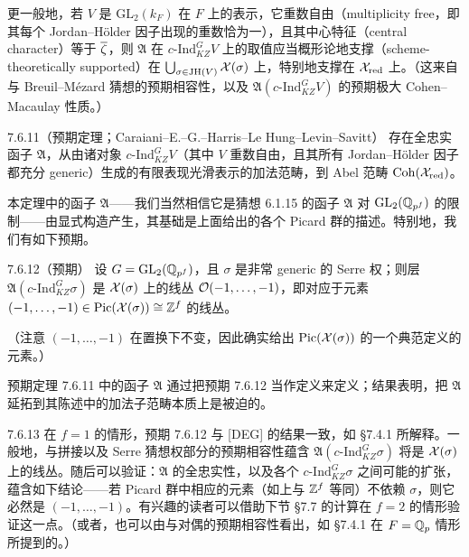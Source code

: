 更一般地，若 $V$ 是 $\mathrm{GL}_2(k_F)$ 在 $F$ 上的表示，它重数自由（multiplicity free，即其每个 Jordan--Hölder 因子出现的重数恰为一），且其中心特征（central character）等于 $\overline\zeta$，则 $\mathfrak A$ 在 $c\text{-}\mathrm{Ind}^G_{KZ}V$ 上的取值应当概形论地支撑（scheme-theoretically supported）在 $\bigcup_{\sigma\in\mathrm{JH}(V)}\mathcal{X}(\sigma)$ 上，特别地支撑在 $\mathcal{X}_{\mathrm{red}}$ 上。（这来自与 Breuil--Mézard 猜想的预期相容性，以及 $\mathfrak A(c\text{-}\mathrm{Ind}^G_{KZ}V)$ 的预期极大 Cohen--Macaulay 性质。）

\begin{thm}{7.6.11（预期定理；Caraiani--E.--G.--Harris--Le Hung--Levin--Savitt）}\label{thm:a4-7-6-11}
存在全忠实函子 $\mathfrak A$，从由诸对象 $c\text{-}\mathrm{Ind}^G_{KZ}V$（其中 $V$ 重数自由，且其所有 Jordan--Hölder 因子都充分 generic）生成的有限表现光滑表示的加法范畴，到 Abel 范畴 $\operatorname{Coh}(\mathcal{X}_{\mathrm{red}})$。
\end{thm}

本定理中的函子 $\mathfrak A$——我们当然相信它是猜想 6.1.15 的函子 $\mathfrak A$ 对 $\mathrm{GL}_2(\mathbb{Q}_{p^f})$ 的限制——由显式构造产生，其基础是上面给出的各个 Picard 群的描述。特别地，我们有如下预期。

\begin{thm}{7.6.12（预期）}\label{thm:a4-7-6-12}
设 $G=\mathrm{GL}_2(\mathbb{Q}_{p^f})$，且 $\sigma$ 是非常 generic 的 Serre 权；则层 $\mathfrak A(c\text{-}\mathrm{Ind}^G_{KZ}\sigma)$ 是 $\mathcal{X}(\sigma)$ 上的线丛 $\mathcal{O}(-1,\dots,-1)$，即对应于元素 $(-1,\dots,-1)\in\mathrm{Pic}(\mathcal{X}(\sigma))\cong\mathbb{Z}^f$ 的线丛。
\end{thm}

（注意 $(-1,\dots,-1)$ 在置换下不变，因此确实给出 $\mathrm{Pic}(\mathcal{X}(\sigma))$ 的一个典范定义的元素。）

预期定理 7.6.11 中的函子 $\mathfrak A$ 通过把预期 7.6.12 当作定义来定义；结果表明，把 $\mathfrak A$ 延拓到其陈述中的加法子范畴本质上是被迫的。

\begin{rem}{7.6.13}\label{thm:a4-7-6-13}
在 $f=1$ 的情形，预期 7.6.12 与 [DEG] 的结果一致，如 §7.4.1 所解释。一般地，与拼接以及 Serre 猜想权部分的预期相容性蕴含 $\mathfrak A(c\text{-}\mathrm{Ind}^G_{KZ}\sigma)$ 将是 $\mathcal{X}(\sigma)$ 上的线丛。随后可以验证：$\mathfrak A$ 的全忠实性，以及各个 $c\text{-}\mathrm{Ind}^G_{KZ}\sigma$ 之间可能的扩张，蕴含如下结论——若 Picard 群中相应的元素（如上与 $\mathbb{Z}^f$ 等同）不依赖 $\sigma$，则它必然是 $(-1,\dots,-1)$。有兴趣的读者可以借助下节 §7.7 的计算在 $f=2$ 的情形验证这一点。（或者，也可以由与对偶的预期相容性看出，如 §7.4.1 在 $F=\mathbb{Q}_p$ 情形所提到的。）
\end{rem}

